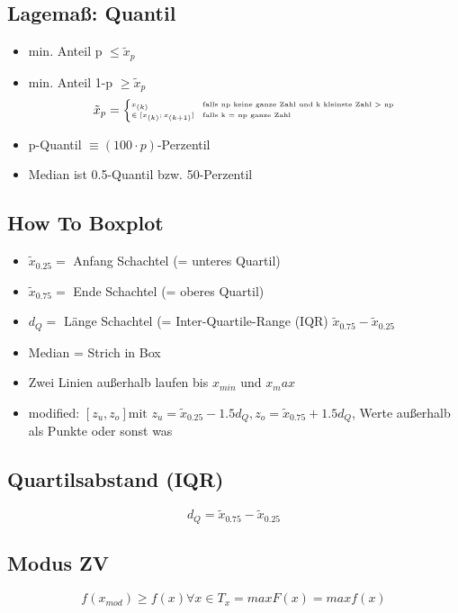 \documentclass[10pt,a4paper,landscape]{article}
\begin{document}
\begin{multicols}{4}
\subsection{Lagemaß: Quantil}
\begin{itemize}
\item min. Anteil p $\leqslant \tilde{x}_p$
\item min. Anteil 1-p $\geqslant \tilde{x}_p$
\begin{align*} \tiny
\tilde{x}_p = \begin{cases}
	x_{(k)} &\text{falls np keine ganze Zahl und k kleinste Zahl > np} \\
	\in[x_{(k)};x_{(k+1)}] &\text{falls k = np ganze Zahl}
	\end{cases}
\end{align*}
\item p-Quantil $\equiv (100\cdot p)$-Perzentil
\item Median ist 0.5-Quantil bzw. 50-Perzentil
\end{itemize}				

\subsection{How To Boxplot}
\begin{itemize}
\item $\tilde{x}_{0.25} =$ Anfang Schachtel (= unteres Quartil)
\item $\tilde{x}_{0.75} =$ Ende Schachtel (= oberes Quartil)
\item $d_Q =$ Länge Schachtel (= Inter-Quartile-Range (IQR) $\tilde{x}_{0.75} - \tilde{x}_{0.25}$
\item Median = Strich in Box
\item Zwei Linien außerhalb laufen bis $x_{min}$ und $x_max$
\item modified: $[z_u, z_o] \text{mit } z_u=\tilde{x}_{0.25}-1.5d_Q, z_o = \tilde{x}_{0.75}+1.5d_Q$, Werte außerhalb als Punkte oder sonst was
\end{itemize}

\subsection{Quartilsabstand (IQR)}
\[
d_Q=\tilde{x}_{0.75} - \tilde{x}_{0.25}
\]

\subsection{Modus ZV}
\[
f(x_{mod})\geqslant f(x) \forall x \in T_x = maxF(x) = maxf(x)
\]


\end{multicols}
\end{document}
